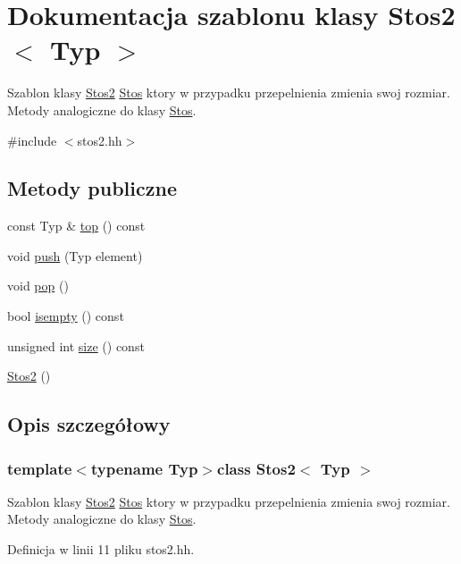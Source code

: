 \hypertarget{class_stos2}{\section{Dokumentacja szablonu klasy Stos2$<$ Typ $>$}
\label{class_stos2}
}


Szablon klasy \hyperlink{class_stos2}{Stos2} \hyperlink{class_stos}{Stos} ktory w przypadku przepelnienia zmienia swoj rozmiar. Metody analogiczne do klasy \hyperlink{class_stos}{Stos}.  




{\ttfamily \#include $<$stos2.\-hh$>$}

\subsection*{Metody publiczne}
\begin{DoxyCompactItemize}
\item 
const Typ \& \hyperlink{class_stos2_a4cefb452cfd2da4eab15b9380c87b219}{top} () const 
\item 
void \hyperlink{class_stos2_ab9bf4dc27877d77a3a53736d33fb965f}{push} (Typ element)
\item 
void \hyperlink{class_stos2_a9695a855dac219cc685cdded92ee38ac}{pop} ()
\item 
bool \hyperlink{class_stos2_a749e533abbbb8db8e5d97e6028869a7a}{isempty} () const 
\item 
unsigned int \hyperlink{class_stos2_a6599f822eabbade13ab6593ebec18182}{size} () const 
\item 
\hyperlink{class_stos2_a91771fcaa090ac82d4e14603624f4dd3}{Stos2} ()
\end{DoxyCompactItemize}


\subsection{Opis szczegółowy}
\subsubsection*{template$<$typename Typ$>$class Stos2$<$ Typ $>$}

Szablon klasy \hyperlink{class_stos2}{Stos2} \hyperlink{class_stos}{Stos} ktory w przypadku przepelnienia zmienia swoj rozmiar. Metody analogiczne do klasy \hyperlink{class_stos}{Stos}. 

Definicja w linii 11 pliku stos2.\-hh.



